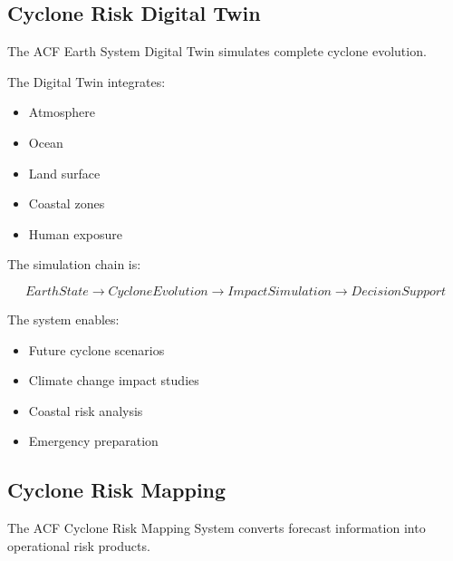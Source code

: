 
\subsection{Cyclone Risk Digital Twin}

The ACF Earth System Digital Twin simulates complete cyclone
evolution.

The Digital Twin integrates:

\begin{itemize}

\item Atmosphere

\item Ocean

\item Land surface

\item Coastal zones

\item Human exposure

\end{itemize}


The simulation chain is:

\[
EarthState
\rightarrow
CycloneEvolution
\rightarrow
ImpactSimulation
\rightarrow
DecisionSupport
\]


The system enables:

\begin{itemize}

\item Future cyclone scenarios

\item Climate change impact studies

\item Coastal risk analysis

\item Emergency preparation

\end{itemize}


\subsection{Cyclone Risk Mapping}

The ACF Cyclone Risk Mapping System converts forecast information into
operational risk products.


